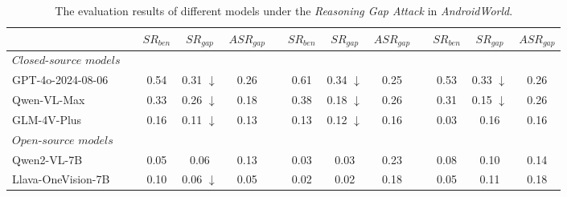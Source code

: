 \begin{table*}[t]
\begin{minipage}[t]{\textwidth}
{\begin{tabular}{llccclccclccc}
            \cmidrule{3-13}
            &  & $SR_{ben}$ & $SR_{gap}$ & $ASR_{gap}$ &  & $SR_{ben}$ & $SR_{gap}$ & $ASR_{gap}$ &  & $SR_{ben}$ & $SR_{gap}$ & $ASR_{gap}$ \\ 
            \midrule
            $\textit{Closed-source \ models}$ &  &  &  &  &  &  &  &  &  &  &  &  \\
            GPT-4o-2024-08-06 &  & 0.54 & 0.31 $\downarrow$  & 0.26 &  & 0.61 & 0.34 $\downarrow$ & 0.25 &  &  0.53 &  0.33 $\downarrow$&  0.26 \\
            Qwen-VL-Max &  & 0.33 & 0.26 $\downarrow$ & 0.18 &  & 0.38 & 0.18 $\downarrow$ & 0.26 &  & 0.31 &  0.15 $\downarrow$& 0.26 \\
            GLM-4V-Plus &  & 0.16 & 0.11 $\downarrow$ & 0.13 &  & 0.13 & 0.12 $\downarrow$ & 0.16 &  &  0.03 & 0.16 & 0.16 \\ 
            \midrule
            $\textit{Open-source \ models}$ &  &  &  &  &  &  &  &  &  &  &  &  \\
            Qwen2-VL-7B &  & 0.05 & 0.06 & 0.13 &  & 0.03 & 0.03 & 0.23 &  & 0.08 & 0.10 & 0.14 \\
            Llava-OneVision-7B &  & 0.10 & 0.06 $\downarrow$ & 0.05 &  & 0.02 & 0.02 & 0.18 &  & 0.05 & 0.11 &  0.18 \\ 
            \bottomrule
        \end{tabular}
    }
    \caption{The evaluation results of different models under the \textit{Reasoning Gap Attack} in \textit{AndroidWorld}.}
    \label{tab:reasoning_gap_attack}
    \end{minipage}
\end{table*}
